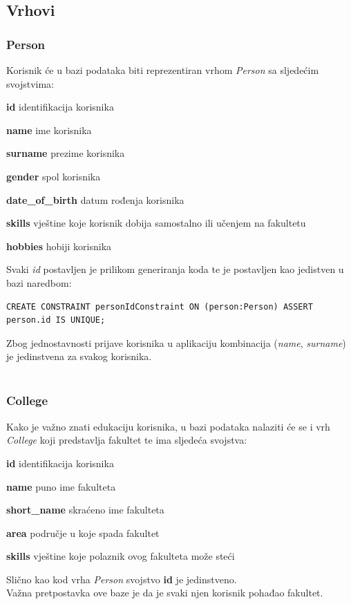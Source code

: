 \documentclass[titlepage, 12pt]{scrartcl}
\begin{document}
\subsection{Vrhovi}
\subsubsection{Person}\label{sec:Person}
Korisnik će u bazi podataka biti reprezentiran vrhom \emph{Person} sa sljedećim svojstvima:
\begin{itemize}
\begin{samepage}
    \item \textbf{id} identifikacija korisnika
    \item \textbf{name} ime korisnika
    \item \textbf{surname} prezime korisnika
    \item \textbf{gender} spol korisnika
    \item \textbf{date\_of\_birth} datum rođenja korisnika
    \item \textbf{skills} vještine koje korisnik dobija samostalno ili učenjem na fakultetu
    \item \textbf{hobbies} hobiji korisnika
\end{samepage}
\end{itemize}
Svaki \emph{id} postavljen je prilikom generiranja koda te je postavljen kao jedistven u bazi naredbom:
\begin{samepage}
\begin{verbatim}
CREATE CONSTRAINT personIdConstraint ON (person:Person) ASSERT person.id IS UNIQUE;
\end{verbatim}
\end{samepage}
Zbog jednostavnosti prijave korisnika u aplikaciju kombinacija (\emph{name}, \emph{surname}) je jedinstvena za svakog korisnika.
\\ \\
\subsubsection{College}
Kako je važno znati edukaciju korisnika, u bazi podataka nalaziti će se i vrh \emph{College} koji predstavlja fakultet te ima sljedeća svojstva:
\begin{itemize}
\begin{samepage}
    \item \textbf{id} identifikacija korisnika
    \item \textbf{name} puno ime fakulteta
    \item \textbf{short\_name} skraćeno ime fakulteta
    \item \textbf{area} područje u koje spada fakultet
    \item \textbf{skills} vještine koje polaznik ovog fakulteta može steći
\end{samepage}
\end{itemize}
Slično kao kod vrha \emph{Person} svojstvo \textbf{id} je jedinstveno. \\
Važna pretpostavka ove baze je da je svaki njen korisnik pohađao fakultet. 
\end{document}
